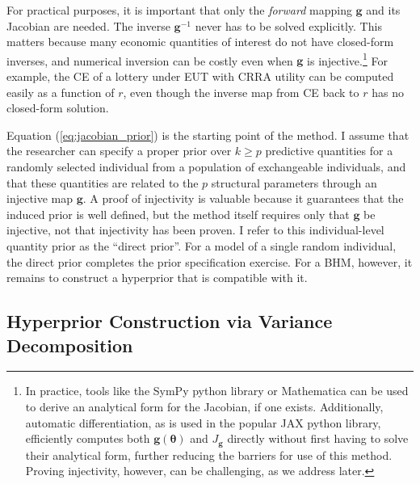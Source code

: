 \documentclass[12pt,a4paper]{article}
\theoremstyle{definition}
\theoremstyle{remark}
\newcommand{\bth}{\boldsymbol{\theta}}
\newcommand{\bg}{\mathbf{g}}
\begin{document}
For practical purposes, it is important that only the \textit{forward} mapping
$\bg$ and its Jacobian are needed. The inverse $\bg^{-1}$ never has to be
solved explicitly. This matters because many economic quantities of interest do
not have closed-form inverses, and numerical inversion can be costly even when
$\bg$ is injective.\footnote{
  In practice, tools like the SymPy python library or Mathematica can be used
  to derive an analytical form for the Jacobian, if one exists. Additionally,
  automatic differentiation, as is used in the popular JAX python library,
  efficiently computes both $\bg(\bth)$ and $J_\bg{}$ directly without first
  having to solve their analytical form, further reducing the barriers for use
  of this method. Proving injectivity, however, can be challenging, as we
  address later.
} For example, the CE of a lottery under EUT with CRRA utility can be computed
easily as a function of $r$, even though the inverse map from CE back to $r$
has no closed-form solution.

Equation (\ref{eq:jacobian_prior}) is the starting point of the method. I
assume that the researcher can specify a proper prior over $k \geq p$
predictive quantities for a randomly selected individual from a population of
exchangeable individuals, and that these quantities are related to the $p$
structural parameters through an injective map $\bg$. A proof of
injectivity is valuable because it guarantees that the induced prior is well
defined, but the method itself requires only that $\bg$ be injective, not that
injectivity has been proven. I refer to this
individual-level quantity prior as the \enquote{direct prior}. For a model of a
single random individual, the direct prior completes the prior specification
exercise. For a BHM, however, it remains to construct a hyperprior that is
compatible with it.


\subsection{Hyperprior Construction via Variance Decomposition}
\label{sec:variance_decomposition}
\end{document}
